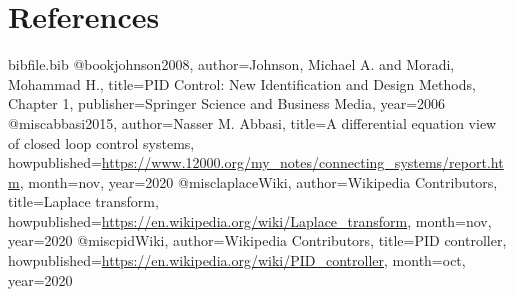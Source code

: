 \documentclass[12pt]{article}
\begin{document}
\section{References}
\label{Sec:References}
\begin{filecontents*}{bibfile.bib}
@book{johnson2008,
author={Johnson, Michael A. and Moradi, Mohammad H.},
title={PID Control: New Identification and Design Methods, Chapter 1},
publisher={Springer Science and Business Media},
year={2006}}
@misc{abbasi2015,
author={Nasser M. Abbasi},
title={A diﬀerential equation view of closed loop control systems},
howpublished={\url{https://www.12000.org/my\_notes/connecting\_systems/report.htm}},
month=nov,
year={2020}}
@misc{laplaceWiki,
author={Wikipedia Contributors},
title={Laplace transform},
howpublished={\url{https://en.wikipedia.org/wiki/Laplace\_transform}},
month=nov,
year={2020}}
@misc{pidWiki,
author={Wikipedia Contributors},
title={PID controller},
howpublished={\url{https://en.wikipedia.org/wiki/PID\_controller}},
month=oct,
year={2020}}
\end{filecontents*}
\nocite{*}
\printbibliography[heading=none]
\end{document}
